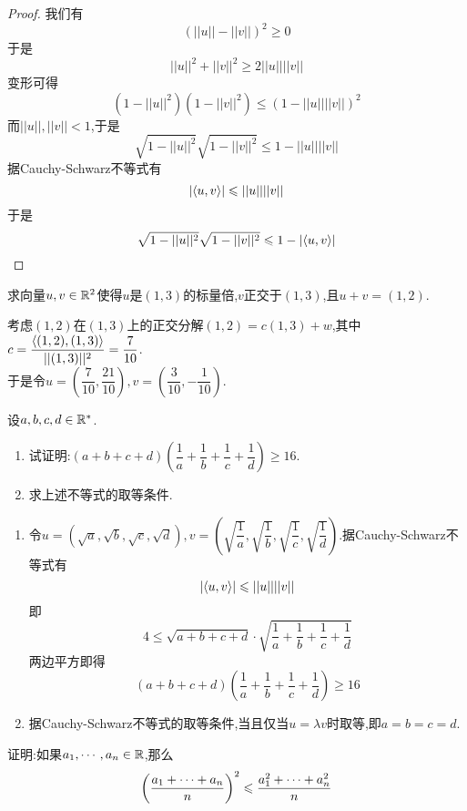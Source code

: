 \documentclass{ctexart}
\begin{document}
\begin{proof}
    我们有
    \[\left(||u||-||v||\right)^2\geqslant0\]
    于是
    \[||u||^2+||v||^2\geqslant2||u||||v||\]
    变形可得
    \[\left(1-||u||^2\right)\left(1-||v||^2\right)\leqslant\left(1-||u||||v||\right)^2\]
    而$||u||,||v||<1$,于是
    \[\sqrt{1-||u||^2}\sqrt{1-||v||^2}\leqslant1-||u||||v||\]
    据Cauchy-Schwarz不等式有
    \[\left|\left\langle{u},{v}\right\rangle\right|\leqslant ||u||||v||\]
    于是
    \[\sqrt{1-||u||^2}\sqrt{1-||v||^2}\leqslant1-\left|\left\langle{u},{v}\right\rangle\right|\]
\end{proof}
\begin{problem}[11.]
    求向量$u,v\in\mathbb{R}^2$使得$u$是$(1,3)$的标量倍,$v$正交于$(1,3)$,且$u+v=(1,2)$.
\end{problem}
\begin{solution}
    考虑$(1,2)$在$(1,3)$上的正交分解$(1,2)=c(1,3)+w$,其中$c=\dfrac{\left\langle{(1,2)},{(1,3)}\right\rangle}{||(1,3)||^2}=\dfrac{7}{10}$.\\
    于是令$u=\left(\dfrac{7}{10},\dfrac{21}{10}\right),v=\left(\dfrac{3}{10},-\dfrac{1}{10}\right)$.
\end{solution}
\begin{problem}[12.]
    设$a,b,c,d\in\mathbb{R}^*$.
    \begin{enumerate}[label=\tbf{(\arabic*)}]
        \item 试证明:$\left(a+b+c+d\right)\left(\dfrac1a+\dfrac1b+\dfrac1c+\dfrac1d\right)\geqslant16$.
        \item 求上述不等式的取等条件.
    \end{enumerate}
\end{problem}
\begin{solution}
    \begin{enumerate}[label=\tbf{(\arabic*)}]
        \item 令$u=\left(\sqrt{a},\sqrt{b},\sqrt{c},\sqrt{d}\right),v=\left(\sqrt{\dfrac1a},\sqrt{\dfrac1b},\sqrt{\dfrac1c},\sqrt{\dfrac1d}\right)$.据Cauchy-Schwarz不等式有
            \[\left|\left\langle{u},{v}\right\rangle\right|\leqslant||u||||v||\]
            即
            \[4\leqslant\sqrt{a+b+c+d}\cdot\sqrt{\dfrac1a+\dfrac1b+\dfrac1c+\dfrac1d}\]
            两边平方即得
            \[\left(a+b+c+d\right)\left(\dfrac1a+\dfrac1b+\dfrac1c+\dfrac1d\right)\geqslant16\]
        \item 据Cauchy-Schwarz不等式的取等条件,当且仅当$u=\lambda v$时取等,即$a=b=c=d$.
    \end{enumerate}
\end{solution}
\begin{problem}[13.]
    证明:如果${a}_1,\cdots,{a}_{n}\in\mathbb{R}$,那么
    \[\left(\dfrac{{a}_1+\cdots+{a}_{n}}{n}\right)^2\leqslant \dfrac{a_1^2+\cdots+a_n^2}{n}\]
\end{problem}
\end{document}
